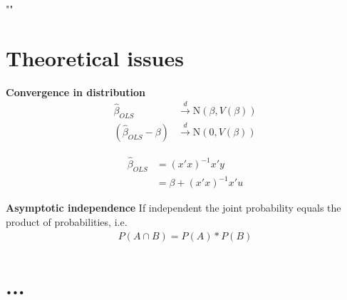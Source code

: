 \epigraph{""}
{\textit{}}

\section{Theoretical issues}
\begin{multicols}{2}
\noindent
\textbf{Convergence in distribution}
\begin{align*}
  \hat{\beta}_{OLS}         &\xrightarrow{d} \textrm{N}(\beta,V(\beta)) \\
  (\hat{\beta}_{OLS}-\beta) &\xrightarrow{d} \textrm{N}(0,V(\beta))
\end{align*}

\begin{align*}
  \hat{\beta}_{OLS} &= (x'x)^{-1}x'y \\
  &= \beta + (x'x)^{-1}x'u
\end{align*}

\textbf{Asymptotic independence}
If independent the joint probability equals the product of probabilities, i.e.
\begin{align*}
  P(A\cap B) = P(A)*P(B)
\end{align*}


\end{multicols}

\section{...}




